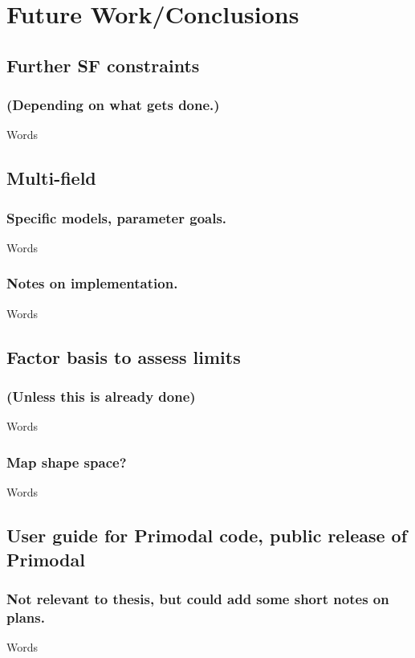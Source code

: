 \chapter{Future Work/Conclusions}\label{chapter:conclusion}
\section{Further SF constraints}
    \subsection{(Depending on what gets done.)}
    Words
\section{Multi-field}
    \subsection{Specific models, parameter goals.}
    Words
    \subsection{Notes on implementation.}
    Words
\section{Factor basis to assess limits}
    \subsection{(Unless this is already done)}
    Words
    \subsection{Map shape space?}
    Words
\section{User guide for Primodal code, public release of Primodal}
    \subsection{Not relevant to thesis, but could add some short notes on plans.}
    Words

